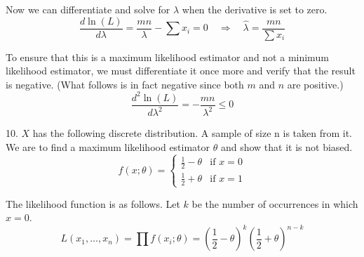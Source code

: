 \documentclass[fleqn]{article}
\begin{document}
\begin{answers}
		Now we can differentiate and solve for \(\lambda\) when the derivative is set to zero.
		\[
			\frac{d\ln(L)}{d\lambda} = \frac{mn}{\lambda} - \sum x_i = 0 \quad \Rightarrow \quad \hat{\lambda} = \frac{mn}{\sum x_i}
		\]

		To ensure that this is a maximum likelihood estimator and not a minimum likelihood estimator, we must differentiate it once more and verify that the result is negative. (What follows is in fact negative since both \(m\) and \(n\) are positive.)
		\[
			\frac{d^2 \ln(L)}{d \lambda^2} = - \frac{mn}{\lambda^2} \leq 0
		\]

	\item[10.]
		\(X\) has the following discrete distribution. A sample of size n is taken from it. We are to find a maximum likelihood estimator \(\hat{\theta}\) and show that it is not biased.
		\[
			f(x; \theta) = \begin{cases}
				\frac{1}{2} - \theta & \text{if } x = 0 \\
				\frac{1}{2} + \theta & \text{if } x = 1
			\end{cases}
		\]

		The likelihood function is as follows. Let \(k\) be the number of occurrences in which \(x = 0\).
		\[
			L(x_1, \dots, x_n) = \prod f(x_i; \theta) = \left(\frac{1}{2} - \theta\right)^k \left(\frac{1}{2} + \theta\right)^{n-k}
		\]


\end{answers}
\end{document}
